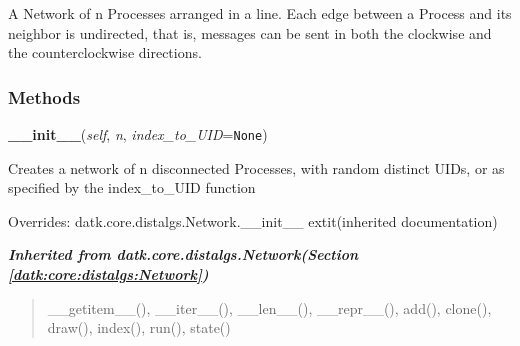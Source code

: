 A Network of n Processes arranged in a line. Each edge between a Process 
and its neighbor is undirected, that is, messages can be sent in both the 
clockwise and the counterclockwise directions.



  \subsubsection{Methods}

    \vspace{0.5ex}

\hspace{.8\funcindent}\begin{boxedminipage}{\funcwidth}

    \raggedright \textbf{\_\_init\_\_}(\textit{self}, \textit{n}, \textit{index\_to\_UID}={\tt None})

\setlength{\parskip}{2ex}
    Creates a network of n disconnected Processes, with random distinct 
    UIDs, or as specified by the index\_to\_UID function

\setlength{\parskip}{1ex}
      Overrides: datk.core.distalgs.Network.\_\_init\_\_ 	extit{(inherited documentation)}

    \end{boxedminipage}


\large{\textbf{\textit{Inherited from datk.core.distalgs.Network\textit{(Section \ref{datk:core:distalgs:Network})}}}}

\begin{quote}
\_\_getitem\_\_(), \_\_iter\_\_(), \_\_len\_\_(), \_\_repr\_\_(), add(), clone(), draw(), index(), run(), state()
\end{quote}


